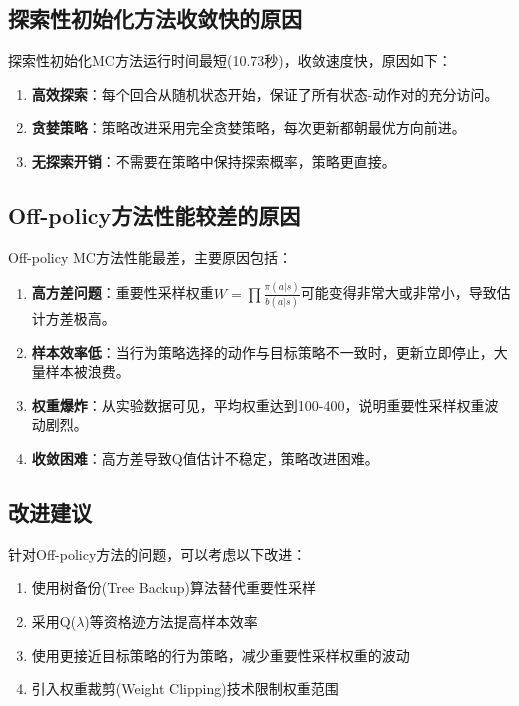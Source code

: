\documentclass[12pt,a4paper]{article}
\begin{document}
\subsection{探索性初始化方法收敛快的原因}

探索性初始化MC方法运行时间最短(10.73秒)，收敛速度快，原因如下：

\begin{enumerate}
    \item \textbf{高效探索}：每个回合从随机状态开始，保证了所有状态-动作对的充分访问。
    
    \item \textbf{贪婪策略}：策略改进采用完全贪婪策略，每次更新都朝最优方向前进。
    
    \item \textbf{无探索开销}：不需要在策略中保持探索概率，策略更直接。
\end{enumerate}

\subsection{Off-policy方法性能较差的原因}

Off-policy MC方法性能最差，主要原因包括：

\begin{enumerate}
    \item \textbf{高方差问题}：重要性采样权重$W = \prod \frac{\pi(a|s)}{b(a|s)}$可能变得非常大或非常小，导致估计方差极高。
    
    \item \textbf{样本效率低}：当行为策略选择的动作与目标策略不一致时，更新立即停止，大量样本被浪费。
    
    \item \textbf{权重爆炸}：从实验数据可见，平均权重达到100-400，说明重要性采样权重波动剧烈。
    
    \item \textbf{收敛困难}：高方差导致Q值估计不稳定，策略改进困难。
\end{enumerate}

\subsection{改进建议}

针对Off-policy方法的问题，可以考虑以下改进：

\begin{enumerate}
    \item 使用树备份(Tree Backup)算法替代重要性采样
    \item 采用Q($\lambda$)等资格迹方法提高样本效率
    \item 使用更接近目标策略的行为策略，减少重要性采样权重的波动
    \item 引入权重裁剪(Weight Clipping)技术限制权重范围
\end{enumerate}
\end{document}
